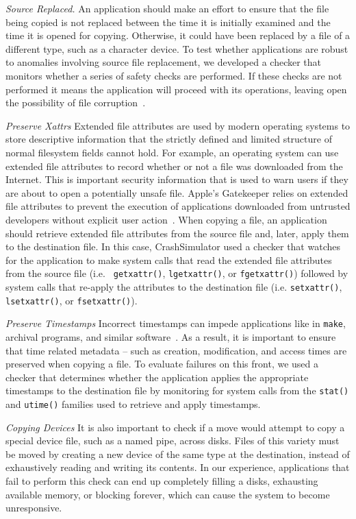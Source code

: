 {\it Source Replaced.} An application should make an effort
to ensure that the file being copied
is not replaced between the time it is initially examined
and the time it is opened for copying.
Otherwise,
it could have been replaced by a file of a different type,
such as a character device.
To test whether applications are robust
to anomalies involving source file replacement,
we developed a checker that monitors whether a series of safety checks
are performed.
If these checks are not performed it
means the application will proceed with its operations,
leaving open the possibility of file corruption~\cite{PythonShutilBug}.

{\it Preserve Xattrs} Extended file attributes
are used by modern operating systems
to store descriptive information
that the strictly defined and limited structure
of normal filesystem fields cannot hold.
For example,
an operating system can use extended file attributes
to record whether or not a file was downloaded from the Internet.
This is important security information
that is used to warn users
if they are about to open a potentially unsafe file.
Apple's Gatekeeper relies on extended file attributes
to prevent the execution of applications downloaded from
untrusted developers without explicit user action~\cite{AppleCodeSigning}.
When copying a file,
an application should retrieve extended file attributes from the source
file and, later, apply them to the destination file.
In this case, CrashSimulator used a checker
that watches for the application to make system calls
that read the extended file attributes from the source file (i.e. {\tt
  getxattr()}, {\tt lgetxattr()}, or {\tt fgetxattr()}) followed by system calls
that re-apply the attributes to the destination file (i.e. {\tt setxattr()},
{\tt lsetxattr()}, or {\tt fsetxattr()}).

{\it Preserve Timestamps} Incorrect timestamps can impede applications like
in {\tt make}, archival programs, and similar
software~\cite{NautilusTimestamps, SudoTimestamp}.
As a result, it is important to ensure
that time related metadata --
such as creation, modification, and access times
are preserved when copying a file.
To evaluate failures on this front,
we used a checker that determines
whether the application applies
the appropriate timestamps to the destination file
by monitoring for system calls from the {\tt stat()}
and {\tt utime()} families used to retrieve and apply timestamps.

{\it Copying Devices} It is also important to check if a move
would attempt to copy a special
device file, such as a named pipe, across disks.
Files of this variety must be moved
by creating a new device of the same type at the destination,
instead of exhaustively reading and writing its contents.
In our experience, applications that fail to perform this check
can end up completely filling a disks, exhausting available memory,
or blocking forever, which can cause the system to become unresponsive.

